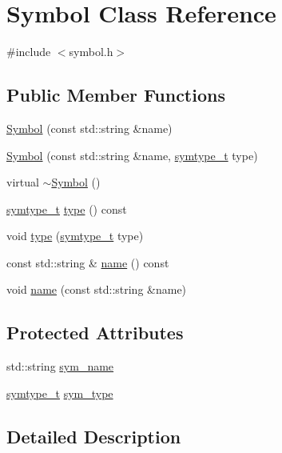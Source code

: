 \hypertarget{class_symbol}{
\section{Symbol Class Reference}
\label{class_symbol}
}


{\ttfamily \#include $<$symbol.h$>$}

\subsection*{Public Member Functions}
\begin{DoxyCompactItemize}
\item 
\hyperlink{class_symbol_a918bcf3f530e98cc9d97cb16381db88f}{Symbol} (const std::string \&name)
\item 
\hyperlink{class_symbol_a696ddf09a21f1a5a6dacac4e49da076e}{Symbol} (const std::string \&name, \hyperlink{symbol_8h_a07090a2a79cb68ad8d84e7ecd6558859}{symtype\_\-t} type)
\item 
virtual \hyperlink{class_symbol_a505360ad4bd2e0bd1e3954eca1b05723}{$\sim$Symbol} ()
\item 
\hyperlink{symbol_8h_a07090a2a79cb68ad8d84e7ecd6558859}{symtype\_\-t} \hyperlink{class_symbol_afc6ea326ca57f6f9292a05a61f2df362}{type} () const 
\item 
void \hyperlink{class_symbol_a7822b485af2e735d462276836479ff24}{type} (\hyperlink{symbol_8h_a07090a2a79cb68ad8d84e7ecd6558859}{symtype\_\-t} type)
\item 
const std::string \& \hyperlink{class_symbol_a8324a8b8848a9bd1957b8d9e69335112}{name} () const 
\item 
void \hyperlink{class_symbol_a474363d0819a0acf6ecd1a547ec3f926}{name} (const std::string \&name)
\end{DoxyCompactItemize}
\subsection*{Protected Attributes}
\begin{DoxyCompactItemize}
\item 
std::string \hyperlink{class_symbol_a131f02876f25c9bdccbd71e1e7147989}{sym\_\-name}
\item 
\hyperlink{symbol_8h_a07090a2a79cb68ad8d84e7ecd6558859}{symtype\_\-t} \hyperlink{class_symbol_a4cb69009155bb4a73a86fc4004655a31}{sym\_\-type}
\end{DoxyCompactItemize}


\subsection{Detailed Description}


